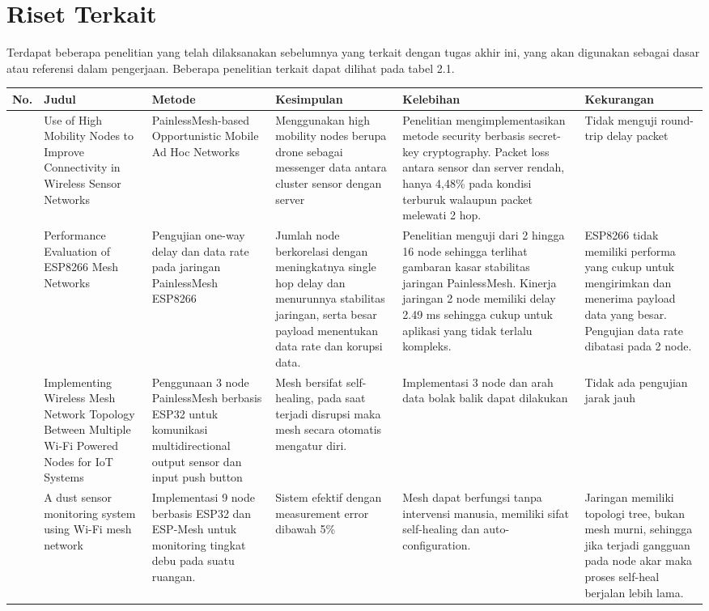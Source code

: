 \section{Riset Terkait}
Terdapat beberapa penelitian yang telah dilaksanakan sebelumnya yang terkait dengan tugas akhir ini, yang akan digunakan sebagai dasar atau referensi dalam pengerjaan. Beberapa penelitian terkait dapat dilihat pada tabel 2.1.
\pagebreak
\begin{center}
	\footnotesize
	\begin{longtable}{|p{0.5cm}|p{2cm}|p{2cm}|p{2cm}|p{2cm}|p{2cm}|}
		\hline
		No.&\textbf{Judul}&\textbf{Metode}&\textbf{Kesimpulan}&\textbf{Kelebihan}&\textbf{Kekurangan}\\
		\hline
		\cite{santosUseHighMobility2021}&Use of High Mobility Nodes to Improve Connectivity in Wireless Sensor Networks&PainlessMesh-based Opportunistic Mobile Ad Hoc Networks&Menggunakan high mobility nodes berupa drone sebagai messenger data antara cluster sensor dengan server&Penelitian mengimplementasikan metode security berbasis secret-key cryptography. Packet loss antara sensor dan server rendah, hanya 4,48\% pada kondisi terburuk walaupun packet melewati 2 hop.
		&Tidak menguji round-trip delay packet\\
		\hline
		\cite{chiaPerformanceEvaluationESP82662019a}&Performance Evaluation of ESP8266 Mesh Networks&Pengujian one-way delay dan data rate pada jaringan PainlessMesh ESP8266& Jumlah node berkorelasi dengan meningkatnya single hop delay dan menurunnya stabilitas jaringan, serta besar payload menentukan data rate dan korupsi data.&Penelitian menguji dari 2 hingga 16 node sehingga terlihat gambaran kasar stabilitas jaringan PainlessMesh. Kinerja jaringan 2 node memiliki delay 2.49 ms sehingga cukup untuk aplikasi yang tidak terlalu kompleks.&ESP8266 tidak memiliki performa yang cukup untuk mengirimkan dan menerima payload data yang besar. Pengujian data rate dibatasi pada 2 node. \\
		\hline
		\cite{manviImplementingWirelessMesh2020}&Implementing Wireless Mesh Network Topology Between Multiple Wi-Fi Powered Nodes for IoT Systems&Penggunaan 3 node PainlessMesh berbasis ESP32 untuk komunikasi multidirectional output sensor dan input push button&Mesh bersifat self-healing, pada saat terjadi disrupsi maka mesh secara otomatis mengatur diri.&Implementasi 3 node dan arah data bolak balik dapat dilakukan&Tidak ada pengujian jarak jauh\\
		\hline
		\cite{guoDustSensorMonitoring2021}&A dust sensor monitoring system using Wi-Fi mesh network&Implementasi 9 node berbasis ESP32 dan ESP-Mesh untuk monitoring tingkat debu pada suatu ruangan.&Sistem efektif dengan measurement error dibawah 5\%&Mesh dapat berfungsi tanpa intervensi manusia, memiliki sifat self-healing dan auto-configuration.& Jaringan memiliki topologi tree, bukan mesh murni, sehingga jika terjadi gangguan pada node akar maka proses self-heal berjalan lebih lama.\\
		\hline
	\end{longtable}
\end{center}

